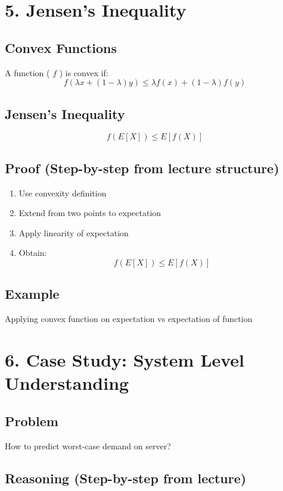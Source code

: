 \documentclass[11pt]{article}
\begin{document}
\section*{5. Jensen’s Inequality}

\subsection*{Convex Functions}

A function ( $f$ ) is convex if:
\[
f(\lambda x + (1-\lambda)y) \le \lambda f(x) + (1-\lambda)f(y)
\]

\subsection*{Jensen’s Inequality}

\[
f(E[X]) \le E[f(X)]
\]

\subsection*{Proof (Step-by-step from lecture structure)}

\begin{enumerate}
\item Use convexity definition
\item Extend from two points to expectation
\item Apply linearity of expectation
\item Obtain:
\[
f(E[X]) \le E[f(X)]
\]
\end{enumerate}

\subsection*{Example}

Applying convex function on expectation vs expectation of function

\section*{6. Case Study: System Level Understanding}

\subsection*{Problem}

How to predict worst-case demand on server?

\subsection*{Reasoning (Step-by-step from lecture)}
\end{document}
